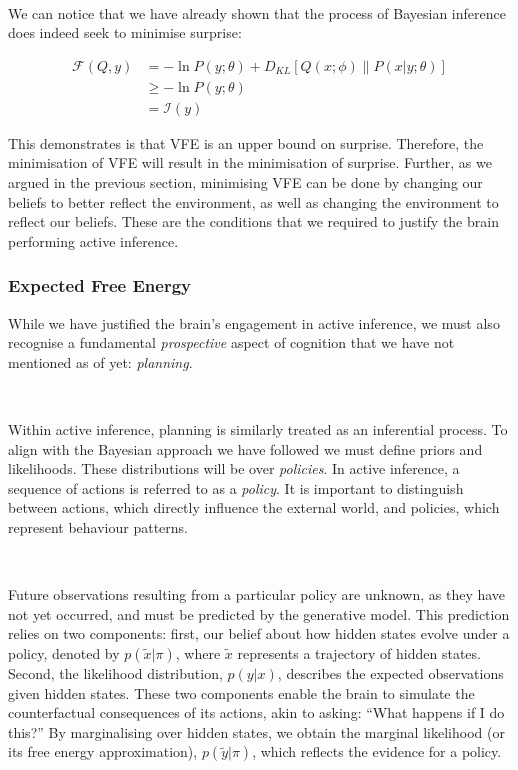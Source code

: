 \documentclass{article}
\begin{document}
\

We can notice that we have already shown that the process of Bayesian inference does indeed seek to minimise surprise:

\begin{equation}
	\begin{aligned}
		\mathcal{F}(Q, y) &= - \ln P(y; \theta) + D_{KL}\left[ Q(x; \phi) \| P(x | y; \theta) \right] \\
		&\geq - \ln P(y; \theta) \\
		&= \mathcal{I}(y)
	\end{aligned}
\end{equation}

This demonstrates is that VFE is an upper bound on surprise. Therefore, the minimisation of VFE will result in the minimisation of surprise. Further, as we argued in the previous section, minimising VFE can be done by changing our beliefs to better reflect the environment, as well as changing the environment to reflect our beliefs. These are the conditions that we required to justify the brain performing active inference. 

\subsubsection{Expected Free Energy}

While we have justified the brain's engagement in active inference, we must also recognise a fundamental \textit{prospective} aspect of cognition that we have not mentioned as of yet: \textit{planning}.

\

Within active inference, planning is similarly treated as an inferential process. To align with the Bayesian approach we have followed we must define priors and likelihoods. These distributions will be over \textit{policies}. In active inference, a sequence of actions is referred to as a \textit{policy}. It is important to distinguish between actions, which directly influence the external world, and policies, which represent behaviour patterns.

\

Future observations resulting from a particular policy are unknown, as they have not yet occurred, and must be predicted by the generative model. This prediction relies on two components: first, our belief about how hidden states evolve under a policy, denoted by $p(\tilde{x} | \pi)$, where $\tilde{x}$ represents a trajectory of hidden states. Second, the likelihood distribution, $p(y | x)$, describes the expected observations given hidden states. These two components enable the brain to simulate the counterfactual consequences of its actions, akin to asking: ``What happens if I do this?'' By marginalising over hidden states, we obtain the marginal likelihood (or its free energy approximation), $p(\tilde{y} | \pi)$, which reflects the evidence for a policy.
\end{document}
